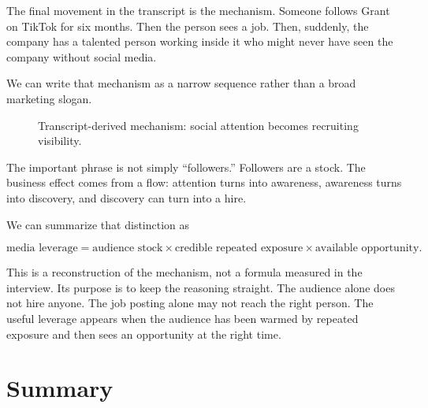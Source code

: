 The final movement in the transcript is the mechanism. Someone follows Grant on TikTok for six months. Then the person sees a job. Then, suddenly, the company has a talented person working inside it who might never have seen the company without social media.

We can write that mechanism as a narrow sequence rather than a broad marketing slogan.

\begin{figure}
\centering
{}
\caption{Transcript-derived mechanism: social attention becomes recruiting visibility.}
\end{figure}

The important phrase is not simply ``followers.'' Followers are a stock. The business effect comes from a flow: attention turns into awareness, awareness turns into discovery, and discovery can turn into a hire.

We can summarize that distinction as

\begin{equation}
\text{media leverage}
=
\text{audience stock}
\times
\text{credible repeated exposure}
\times
\text{available opportunity}.
\end{equation}

This is a reconstruction of the mechanism, not a formula measured in the interview. Its purpose is to keep the reasoning straight. The audience alone does not hire anyone. The job posting alone may not reach the right person. The useful leverage appears when the audience has been warmed by repeated exposure and then sees an opportunity at the right time.

\section{Summary}

